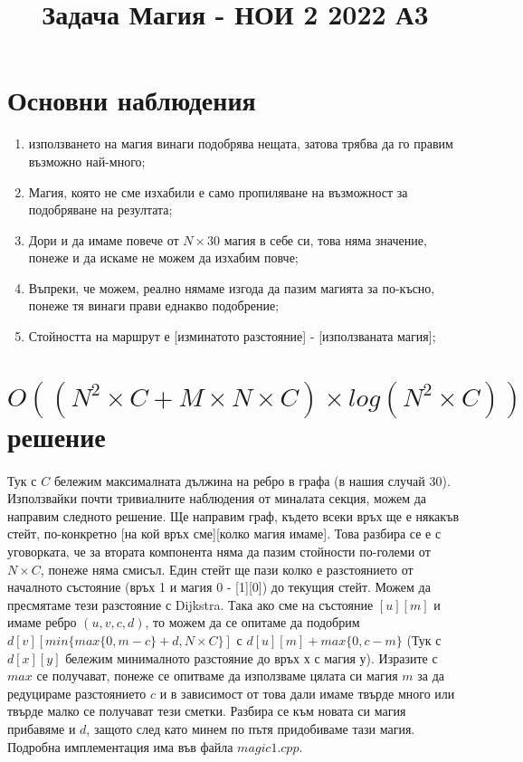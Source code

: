 \documentclass[12pt]{article}
\begin{document}
\title{Задача Магия - НОИ 2 2022 А3}
\date{}
\maketitle

\section{Основни наблюдения}
\begin{enumerate}
	\item използването на магия винаги подобрява нещата, затова трябва да го правим възможно най-много;
	\item Магия, която не сме изхабили е само пропиляване на възможност за подобряване на резултата;
	\item Дори и да имаме повече от $N \times 30$ магия в себе си, това няма значение, понеже и да искаме не можем да изхабим повче;  
	\item Въпреки, че можем, реално нямаме изгода да пазим магията за по-късно, понеже тя винаги прави еднакво подобрение;
	\item Стойността на маршрут е [изминатото разстояние] - [използваната магия];
\end{enumerate}

\section*{$O((N^2 \times C + M \times N \times C) \times log(N^2 \times C))$ решение}
\paragraph*{}
Тук с $C$ бележим максималната дължина на ребро в графа (в нашия случай 30). Използвайки почти тривиалните наблюдения от миналата секция, можем да направим следното решение. Ще направим граф, където всеки връх ще е някакъв стейт, по-конкретно [на кой връх сме][колко магия имаме]. Това разбира се е с уговорката, че за втората компонента няма да пазим стойности по-големи от $N \times C$, понеже няма смисъл. Един стейт ще пази колко е разстоянието от началното състояние (връх 1 и магия 0 - [1][0]) до текущия стейт. Можем да пресмятаме тези разстояние с Dijkstra. Така ако сме на състояние $[u][m]$ и имаме ребро $(u, v, c, d)$, то можем да се опитаме да подобрим $d[v][min \{ max \{ 0, m - c \} + d, N \times C \} ]$ с $d[u][m] + max\{ 0, c - m \}$ (Тук с $d[x][y]$ бележим минималното разстояние до връх х с магия у). Изразите с $max$ се получават, понеже се опитваме да използваме цялата си магия $m$ за да редуцираме разстоянието $c$ и в зависимост от това дали имаме твърде много или твърде малко се получават тези сметки. Разбира се към новата си магия прибавяме и $d$, защото след като минем по пътя придобиваме тази магия. Подробна имплементация има във файла $magic1.cpp$. 
\end{document}
